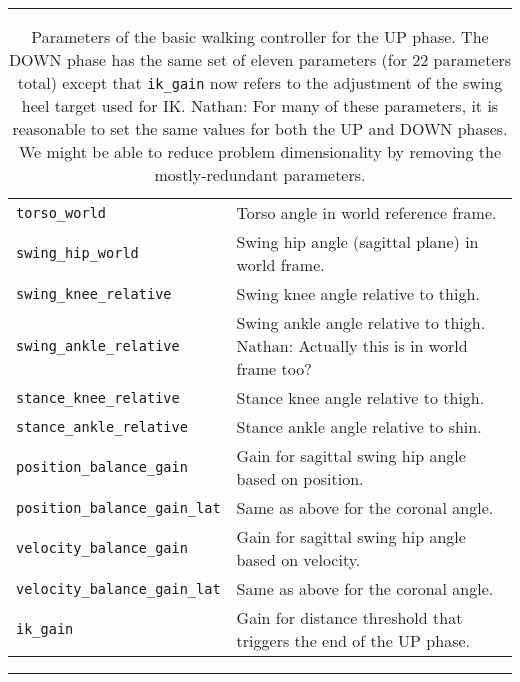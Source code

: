 \documentclass[a4paper]{article}
\newcommand{\nhatch}[1]{{\leavevmode\color{blue} Nathan: #1}}
\begin{document}
\begin{table}
  \caption{Parameters of the basic walking controller for the UP phase.
  The DOWN phase has the same set of eleven parameters (for 22 parameters total) except that \texttt{ik\_gain} now refers to the adjustment of the swing heel target used for IK.
  \nhatch{For many of these parameters, it is reasonable to set the same values for both the UP and DOWN phases. We might be able to reduce problem dimensionality by removing the mostly-redundant parameters.}}
  \label{table:params}
  \hrule
  \begin{tabular}{ll}
    \texttt{torso\_world} & Torso angle in world reference frame. \\
    \texttt{swing\_hip\_world} & Swing hip angle (sagittal plane) in world frame. \\
    \texttt{swing\_knee\_relative} & Swing knee angle relative to thigh.\\
    \texttt{swing\_ankle\_relative} & Swing ankle angle relative to thigh. \nhatch{Actually this is in world frame too?}\\
    \texttt{stance\_knee\_relative} & Stance knee angle relative to thigh.\\
    \texttt{stance\_ankle\_relative} & Stance ankle angle relative to shin.\\
    \texttt{position\_balance\_gain} & Gain for sagittal swing hip angle based on position.\\
    \texttt{position\_balance\_gain\_lat} & Same as above for the coronal angle.\\
    \texttt{velocity\_balance\_gain} & Gain for sagittal swing hip angle based on velocity.\\
    \texttt{velocity\_balance\_gain\_lat} & Same as above for the coronal angle.\\
    \texttt{ik\_gain} & Gain for distance threshold that triggers the end of the UP phase.
  \end{tabular}
  \hrule
\end{table}
\end{document}
